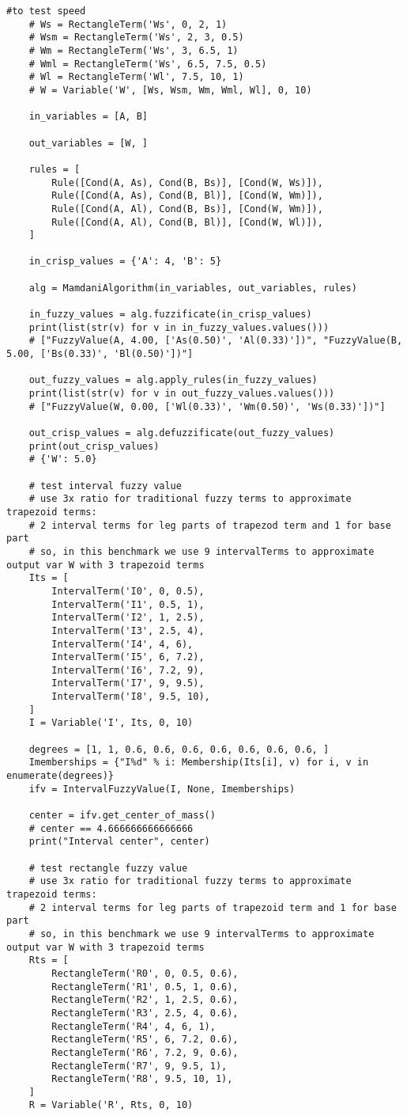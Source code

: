 \begin{lstlisting}[style=pythonstyle,caption={ }, label=lst:func:1]
	#to test speed
	# Ws = RectangleTerm('Ws', 0, 2, 1)
	# Wsm = RectangleTerm('Ws', 2, 3, 0.5)
	# Wm = RectangleTerm('Ws', 3, 6.5, 1)
	# Wml = RectangleTerm('Ws', 6.5, 7.5, 0.5)
	# Wl = RectangleTerm('Wl', 7.5, 10, 1)
	# W = Variable('W', [Ws, Wsm, Wm, Wml, Wl], 0, 10)

	in_variables = [A, B]

	out_variables = [W, ]

	rules = [
		Rule([Cond(A, As), Cond(B, Bs)], [Cond(W, Ws)]),
		Rule([Cond(A, As), Cond(B, Bl)], [Cond(W, Wm)]),
		Rule([Cond(A, Al), Cond(B, Bs)], [Cond(W, Wm)]),
		Rule([Cond(A, Al), Cond(B, Bl)], [Cond(W, Wl)]),
	]

	in_crisp_values = {'A': 4, 'B': 5}

	alg = MamdaniAlgorithm(in_variables, out_variables, rules)

	in_fuzzy_values = alg.fuzzificate(in_crisp_values)
	print(list(str(v) for v in in_fuzzy_values.values()))
	# ["FuzzyValue(A, 4.00, ['As(0.50)', 'Al(0.33)'])", "FuzzyValue(B, 5.00, ['Bs(0.33)', 'Bl(0.50)'])"]

	out_fuzzy_values = alg.apply_rules(in_fuzzy_values)
	print(list(str(v) for v in out_fuzzy_values.values()))
	# ["FuzzyValue(W, 0.00, ['Wl(0.33)', 'Wm(0.50)', 'Ws(0.33)'])"]

	out_crisp_values = alg.defuzzificate(out_fuzzy_values)
	print(out_crisp_values)
	# {'W': 5.0}

	# test interval fuzzy value
	# use 3x ratio for traditional fuzzy terms to approximate trapezoid terms:
	# 2 interval terms for leg parts of trapezod term and 1 for base part
	# so, in this benchmark we use 9 intervalTerms to approximate output var W with 3 trapezoid terms
	Its = [
		IntervalTerm('I0', 0, 0.5),
		IntervalTerm('I1', 0.5, 1),
		IntervalTerm('I2', 1, 2.5),
		IntervalTerm('I3', 2.5, 4),
		IntervalTerm('I4', 4, 6),
		IntervalTerm('I5', 6, 7.2),
		IntervalTerm('I6', 7.2, 9),
		IntervalTerm('I7', 9, 9.5),
		IntervalTerm('I8', 9.5, 10),
	]
	I = Variable('I', Its, 0, 10)

	degrees = [1, 1, 0.6, 0.6, 0.6, 0.6, 0.6, 0.6, 0.6, ]
	Imemberships = {"I%d" % i: Membership(Its[i], v) for i, v in enumerate(degrees)}
	ifv = IntervalFuzzyValue(I, None, Imemberships)

	center = ifv.get_center_of_mass()
	# center == 4.666666666666666
	print("Interval center", center)

	# test rectangle fuzzy value
	# use 3x ratio for traditional fuzzy terms to approximate trapezoid terms:
	# 2 interval terms for leg parts of trapezoid term and 1 for base part
	# so, in this benchmark we use 9 intervalTerms to approximate output var W with 3 trapezoid terms
	Rts = [
		RectangleTerm('R0', 0, 0.5, 0.6),
		RectangleTerm('R1', 0.5, 1, 0.6),
		RectangleTerm('R2', 1, 2.5, 0.6),
		RectangleTerm('R3', 2.5, 4, 0.6),
		RectangleTerm('R4', 4, 6, 1),
		RectangleTerm('R5', 6, 7.2, 0.6),
		RectangleTerm('R6', 7.2, 9, 0.6),
		RectangleTerm('R7', 9, 9.5, 1),
		RectangleTerm('R8', 9.5, 10, 1),
	]
	R = Variable('R', Rts, 0, 10)


\end{lstlisting}
